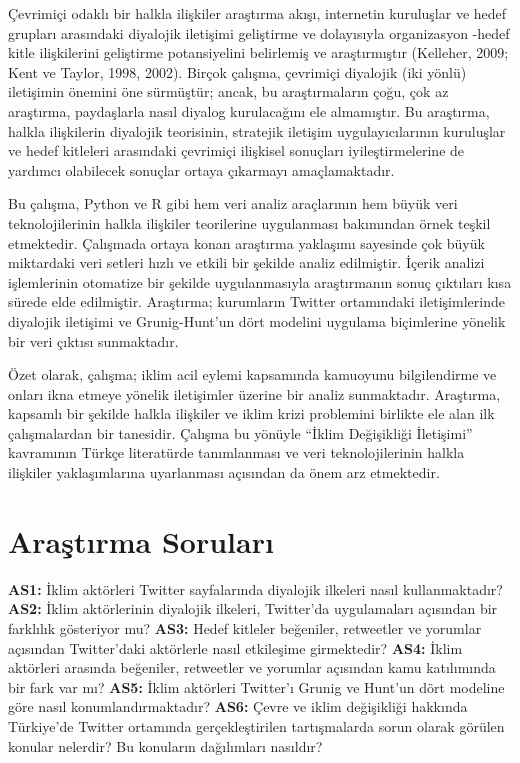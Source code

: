 \documentclass[
]{book}
\begin{document}
Çevrimiçi odaklı bir halkla ilişkiler araştırma akışı, internetin kuruluşlar ve hedef grupları arasındaki diyalojik iletişimi geliştirme ve dolayısıyla organizasyon -hedef kitle ilişkilerini geliştirme potansiyelini belirlemiş ve araştırmıştır (Kelleher, 2009; Kent ve Taylor, 1998, 2002). Birçok çalışma, çevrimiçi diyalojik (iki yönlü) iletişimin önemini öne sürmüştür; ancak, bu araştırmaların çoğu, çok az araştırma, paydaşlarla nasıl diyalog kurulacağını ele almamıştır. Bu araştırma, halkla ilişkilerin diyalojik teorisinin, stratejik iletişim uygulayıcılarının kuruluşlar ve hedef kitleleri arasındaki çevrimiçi ilişkisel sonuçları iyileştirmelerine de yardımcı olabilecek sonuçlar ortaya çıkarmayı amaçlamaktadır.

Bu çalışma, Python ve R gibi hem veri analiz araçlarının hem büyük veri teknolojilerinin halkla ilişkiler teorilerine uygulanması bakımından örnek teşkil etmektedir. Çalışmada ortaya konan araştırma yaklaşımı sayesinde çok büyük miktardaki veri setleri hızlı ve etkili bir şekilde analiz edilmiştir. İçerik analizi işlemlerinin otomatize bir şekilde uygulanmasıyla araştırmanın sonuç çıktıları kısa sürede elde edilmiştir. Araştırma; kurumların Twitter ortamındaki iletişimlerinde diyalojik iletişimi ve Grunig-Hunt'un dört modelini uygulama biçimlerine yönelik bir veri çıktısı sunmaktadır.

Özet olarak, çalışma; iklim acil eylemi kapsamında kamuoyunu bilgilendirme ve onları ikna etmeye yönelik iletişimler üzerine bir analiz sunmaktadır. Araştırma, kapsamlı bir şekilde halkla ilişkiler ve iklim krizi problemini birlikte ele alan ilk çalışmalardan bir tanesidir. Çalışma bu yönüyle ``İklim Değişikliği İletişimi'' kavramının Türkçe literatürde tanımlanması ve veri teknolojilerinin halkla ilişkiler yaklaşımlarına uyarlanması açısından da önem arz etmektedir.

\hypertarget{araux15ftux131rma-sorularux131}{%
\section{Araştırma Soruları}\label{araux15ftux131rma-sorularux131}}

\textbf{AS1:} İklim aktörleri Twitter sayfalarında diyalojik ilkeleri nasıl kullanmaktadır? \textbf{AS2:} İklim aktörlerinin diyalojik ilkeleri, Twitter'da uygulamaları açısından bir farklılık gösteriyor mu?
\textbf{AS3:} Hedef kitleler beğeniler, retweetler ve yorumlar açısından Twitter'daki aktörlerle nasıl etkileşime girmektedir?
\textbf{AS4:} İklim aktörleri arasında beğeniler, retweetler ve yorumlar açısından kamu katılımında bir fark var mı?
\textbf{AS5:} İklim aktörleri Twitter'ı Grunig ve Hunt'un dört modeline göre nasıl konumlandırmaktadır?
\textbf{AS6:} Çevre ve iklim değişikliği hakkında Türkiye'de Twitter ortamında gerçekleştirilen tartışmalarda sorun olarak görülen konular nelerdir? Bu konuların dağılımları nasıldır?
\end{document}
